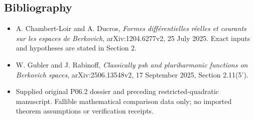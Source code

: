\documentclass[
  11pt,
]{article}
\providecommand{\tightlist}{%
  \setlength{\itemsep}{0pt}\setlength{\parskip}{0pt}}
\begin{document}
\subsection{Bibliography}\label{bibliography}

\begin{itemize}
\tightlist
\item
  A. Chambert-Loir and A. Ducros, \emph{Formes différentielles réelles
  et courants sur les espaces de Berkovich}, arXiv:1204.6277v2, 25 July
  2025. Exact inputs and hypotheses are stated in Section 2.
\item
  W. Gubler and J. Rabinoff, \emph{Classically psh and pluriharmonic
  functions on Berkovich spaces}, arXiv:2506.13548v2, 17 September 2025,
  Section 2.11(5').
\item
  Supplied original P06.2 dossier and preceding restricted-quadratic
  manuscript. Fallible mathematical comparison data only; no imported
  theorem assumptions or verification receipts.
\end{itemize}
\end{document}
